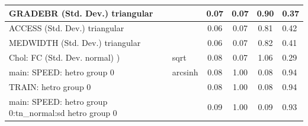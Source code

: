 \begin{table}
\begin{center}
\begin{tabular}{|l|l|c|c|c|l|}
			\hline
			GRADEBR (Std. Dev.) triangular &  & 0.07 & 0.07 & 0.90 & 0.37 \\
			\hline
			ACCESS (Std. Dev.) triangular &  & 0.06 & 0.07 & 0.81 & 0.42 \\
			\hline
			MEDWIDTH (Std. Dev.) triangular &  & 0.06 & 0.07 & 0.82 & 0.41 \\
			\hline
			 Chol: FC (Std. Dev. normal) ) & sqrt & 0.08 & 0.07 & 1.06 & 0.29 \\
			\hline
			main: SPEED: hetro group 0 & arcsinh & 0.08 & 1.00 & 0.08 & 0.94 \\
			\hline
			TRAIN: hetro group 0 &  & 0.08 & 1.00 & 0.08 & 0.94 \\
			\hline
			main: SPEED: hetro group 0:tn_normal:sd  hetro group 0 &  & 0.09 & 1.00 & 0.09 & 0.93 \\
			\hline
		\end{tabular}
	\end{center}
\end{table}
